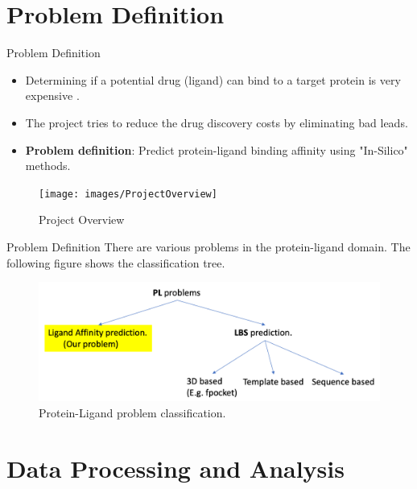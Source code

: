 \documentclass{beamer}
\begin{document}
\section{Problem Definition}

\begin{frame}[t]{Problem Definition}

\begin{itemize}
\item Determining if a potential drug (ligand) can bind to a target protein is very expensive \cite{drugdiscoverycost}.
\item The project tries to reduce the drug discovery costs by eliminating bad leads.
\item \textbf{Problem definition}: Predict protein-ligand binding affinity using "In-Silico" methods. 
\end{itemize}

\begin{figure}[htb]
  \centering
    \texttt{[image: images/ProjectOverview]}
    \caption{Project Overview}
    \label{fig:ProjectOverviewImage}
\end{figure}

\end{frame}

\begin{frame}[t]{Problem Definition}
There are various problems in the protein-ligand domain.  The following figure shows the classification tree.

\begin{figure}[htb]
  \centering
    \includegraphics[scale=0.35]{images/pl_problem_classification}
    \caption{Protein-Ligand problem classification.}
    \label{fig:plproblemclassification}
\end{figure}

\end{frame}

\section{Data Processing and Analysis}
\end{document}
